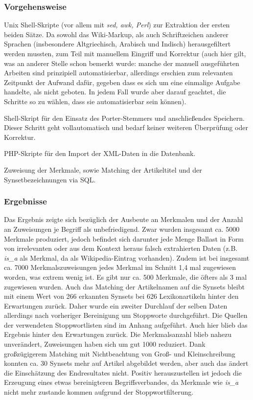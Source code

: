 \documentclass[pagesize,DIV=calc,12pt,draft]{scrreprt}
\begin{document}
\subsubsection{Vorgehensweise}

\begin{inparaenum}
\item Unix Shell-Skripte (vor allem mit \emph{sed, awk, Perl}) zur Extraktion der ersten beiden Sätze. 
Da sowohl das Wiki-Markup, als auch Schriftzeichen anderer Sprachen (insbesondere Altgriechisch, Arabisch und Indisch) herausgefiltert werden mussten, zum Teil mit manuellem Eingriff und Korrektur (auch hier gilt, was an anderer Stelle schon bemerkt wurde: manche der manuell ausgeführten Arbeiten sind prinzipiell automatisierbar, allerdings erschien zum relevanten Zeitpunkt der Aufwand dafür, gegeben dass es sich um eine einmalige Aufgabe handelte, als nicht geboten. 
In jedem Fall wurde aber darauf geachtet, die Schritte so zu wählen, dass sie automatisierbar sein können). 

\item Shell-Skript für den Einsatz des Porter-Stemmers und anschließendes Speichern. 
Dieser Schritt geht vollautomatisch und bedarf keiner weiteren Überprüfung oder Korrektur. 
\item PHP-Skripte für den Import der XML-Daten in die Datenbank.

\item Zuweisung der Merkmale, sowie Matching der Artikeltitel und der Synsetbezeichnungen via SQL. 
\end{inparaenum}

\subsubsection{Ergebnisse}

Das Ergebnis zeigte sich bezüglich der Ausbeute an Merkmalen und der Anzahl an Zuweisungen je Begriff als unbefriedigend. 
Zwar wurden insgesamt ca. 5000 Merkmale produziert, jedoch befindet sich darunter jede Menge Ballast in Form von irrelevanten oder aus dem Kontext heraus falsch extrahierten Daten (z.B. \emph{is\_a} als Merkmal, da als Wikipedia-Eintrag vorhanden). 
Zudem ist bei insgesamt ca. 7000 Merkmalszuweisungen jedes Merkmal im Schnitt 1,4 mal zugewiesen worden, was extrem wenig ist. 
Es gibt nur ca. 500 Merkmale, die öfters als 3 mal zugewiesen wurden. 
Auch das Matching der Artikelnamen auf die Synsets bleibt mit einem Wert von 266 erkannten Synsets bei 626 Lexikonartikeln hinter den Erwartungen zurück. 
Daher wurde ein zweiter Durchlauf der selben Daten allerdings nach vorheriger Bereinigung um Stoppworte durchgeführt. 
Die Quellen der verwendeten Stoppwortlisten sind im Anhang aufgeführt. 
Auch hier blieb das Ergebnis hinter den Erwartungen zurück. 
Die Merkmalsanzahl blieb nahezu unverändert, Zuweisungen haben sich um gut 1000 reduziert. 
Dank großzügigerem Matching mit Nichtbeachtung von Groß- und Kleinschreibung konnten ca. 30 Synsets mehr auf Artikel abgebildet werden, aber auch das ändert die Einschätzung des Endresultates nicht. 
Positiv herauszustellen ist jedoch die Erzeugung eines etwas bereinigteren Begriffsverbandes, da Merkmale wie \emph{is\_a} nicht mehr zustande kommen aufgrund der Stoppwortfilterung. 
\end{document}
